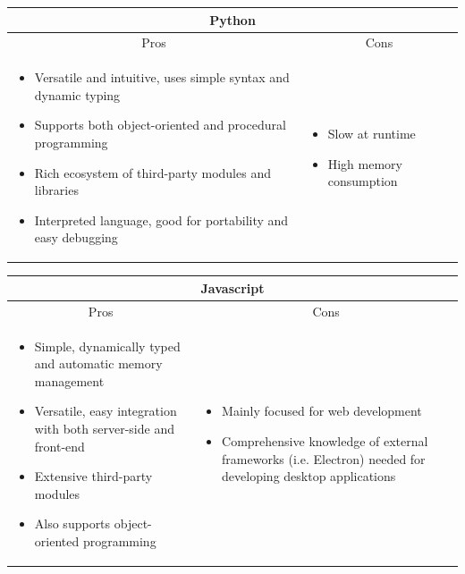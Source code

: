 \documentclass[../main/main.tex]{subfiles}
\begin{document}
\begin{longtable}{ll}
    \toprule
    \multicolumn{2}{c}{Python}\\
    \midrule
    \multicolumn{1}{c}{Pros} & \multicolumn{1}{c}{Cons}\\
    \midrule

    \parbox[t][][t]{0.5\textwidth}{
        \begin{itemize}
            \item Versatile and intuitive, uses simple syntax and dynamic typing
            \item Supports both object-oriented and procedural programming
            \item Rich ecosystem of third-party modules and libraries
            \item Interpreted language, good for portability and easy debugging
        \end{itemize}
    } & \parbox[t][][t]{0.5\textwidth}{
        \begin{itemize}
            \item Slow at runtime
            \item High memory consumption
        \end{itemize}
    }
    \\
    \bottomrule
\end{longtable}

\begin{longtable}{ll}
    \toprule
    \multicolumn{2}{c}{Javascript}\\
    \midrule
    \multicolumn{1}{c}{Pros} & \multicolumn{1}{c}{Cons}\\
    \midrule

    \parbox[t][][t]{0.5\textwidth}{
        \begin{itemize}
            \item Simple, dynamically typed and automatic memory management
            \item Versatile, easy integration with both server-side and front-end
            \item Extensive third-party modules
            \item Also supports object-oriented programming
        \end{itemize}
    } & \parbox[t][][t]{0.5\textwidth}{
        \begin{itemize}
            \item Mainly focused for web development
            \item Comprehensive knowledge of external frameworks (i.e. Electron) needed for developing desktop applications
        \end{itemize}
    }
    \\
    \bottomrule
\end{longtable}
\end{document}
